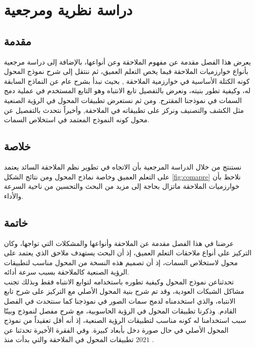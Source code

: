 \chapter{دراسة نظرية ومرجعية}
\section{مقدمة}
يعرض هذا الفصل مقدمة عن مفهوم الملاحقة وعن أنواعها، بالإضافة إلى دراسة مرجعية بأنواع خوارزميات الملاحقة فيما يخص التعلم العميق، ثم ننتقل إلى شرح نموذج المحول كونه الكتلة الأساسية في خوارزمية الملاحقة 
,
بحيث نبدأ بشرح عام عن النماذج السابقة له، وكيفية تطور بنيته، ونعرض بالتفصيل تابع الانتباه وهو التابع المستخدم في عملية دمج السمات في نموذجنا المقترح.
ومن ثم نستعرض تطبيقات المحول في الرؤية الصنعية مثل الكشف والتصنيف ونركز على تطبيقاته في الملاحقة, وأخيراً نتحدث بالتفصيل عن محول 
كونه النموذج المعتمد في استخلاص السمات.








\section{خلاصة}
نستنتج من خلال الدراسة المرجعية بأن الاتجاه في تطوير نظم الملاحقة السائد يعتمد على التعلم العميق وخاصة نماذج المحول
ومن نتائج الشكل 
\ref{fig:comapre}
نلاحظ بأن خوارزميات الملاحقة ماتزال بحاجة إلى مزيد من البحث والتحسين من ناحية السرعة والأداء.
\section{خاتمة}
عرضنا في هذا الفصل مقدمة عن الملاحقة وأنواعها والمشكلات التي تواجها، وكان التركيز على أنواع ملاحقات التعلم العميق، إذ أن البحث يستهدف ملاحق 
الذي يعتمد على محول
لاستخلاص السمات، إذ أن تصميم هذه النسخة من المحول مناسب لتطبيقات الرؤية الصنعية كالملاحقة بسبب سرعة أدائه.
\\
تحدثناعن نموذج المحول وكيفية تطوره باستخدامه لتوابع الانتباه فقط وبذلك تجنب مشاكل الشبكات العودية، وقد تم شرح بنية المحول الأصلي مع التركيز على شرح تابع الانتباه، والذي استخدمناه لدمج سمات الصور في نموذجنا كما سنتحدث في الفصل القادم. وذكرنا تطبيقات المحول في الرؤية الحاسوبية، مع شرح مفصل لنموذج
وبينّا سبب استخدامنا له كونه مناسب لتطبيقات الرؤية الصنعية، إذ أنه أقل تعقيداً من نموذج المحول الأصلي في حال صورة دخل بأبعاد كبيرة.
وفي الفقرة الأخيرة تحدثنا عن تطبيقات المحول في  الملاحقة والتي بدأت منذ $2021$ .










